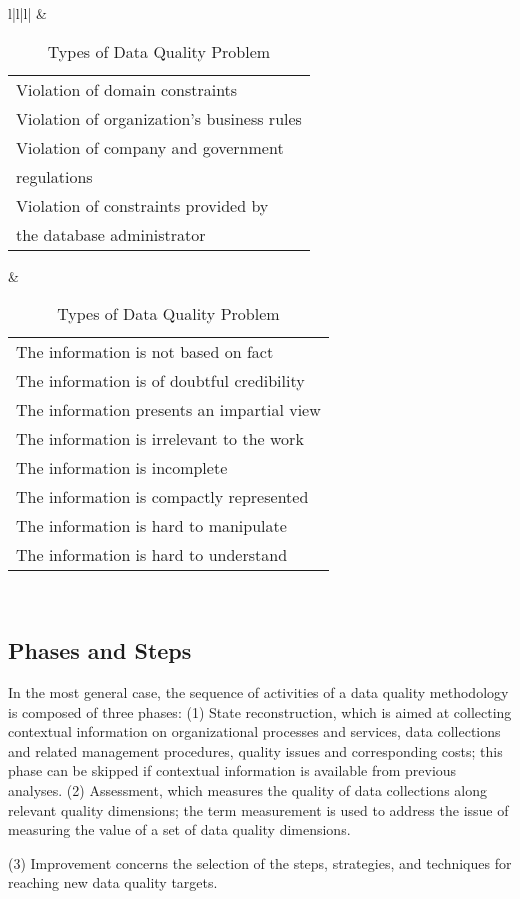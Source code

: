 \documentclass[pdftex,english,oribibl]{llncs}
\begin{document}
\begin{table}[]
\begin{tabular}{l|l|l|}
   & \begin{tabular}[c]{@{}l@{}}Violation of domain constraints \\ Violation of organization’s business rules\\ Violation of company and government\\ regulations \\ Violation of constraints provided by\\  the database administrator\end{tabular}                              & \begin{tabular}[c]{@{}l@{}}The information is not based on fact \\ The information is of doubtful credibility\\ The information presents an impartial view\\ The information is irrelevant to the work\\ The information is incomplete\\ The information is compactly represented\\ The information is hard to manipulate \\ The information is hard to understand\end{tabular} \\ \hline
\end{tabular}
\caption{Types of Data Quality Problem}
\label{table:DataQualityProblem}
\end{table}

\subsection{Phases and Steps}
In the most general case, the sequence of activities of a data quality methodology is composed of three phases:
(1) State reconstruction, which is aimed at collecting contextual information on organizational processes and services, data collections and related management procedures, quality issues and corresponding costs; this phase can be skipped if contextual information is available from previous analyses.
(2) Assessment, which measures the quality of data collections along relevant quality dimensions; the term measurement is used to address the issue of measuring the value of a set of data quality dimensions.
\begin{comment}
The term assessment is used when such measurements are compared to reference values, in order to enable a diagnosis of quality. The term assessment is adopted in this article, consistent with the majority of methodologies, which stress the importance of the causes of poor data quality.
\end{comment}
(3) Improvement concerns the selection of the steps, strategies, and techniques for reaching new data quality targets.
\end{document}
